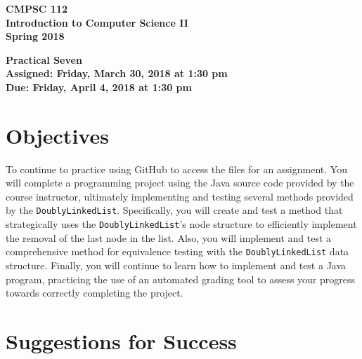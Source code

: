 \documentclass[11pt]{article}
\newcommand{\assignmentduedate}{April 4}
\newcommand{\assignmentassignedate}{March 30}
\newcommand{\assignmentnumber}{Seven}
\newcommand{\labyear}{2018}
\newcommand{\labday}{Friday}
\newcommand{\labtime}{1:30 pm}
\newcommand{\assigneddate}{Assigned: \labday, \assignmentassignedate, \labyear{} at \labtime{}}
\newcommand{\duedate}{Due: \labday, \assignmentduedate, \labyear{} at \labtime{}}
\newcommand{\mainprogram}{\lstinline{DoublyLinkedList}}
\newcommand{\labtitle}[1]
{
  \begin{center}
    \begin{center}
      \bf
      CMPSC 112\\Introduction to Computer Science II\\
      Spring 2018\\
      \medskip
    \end{center}
    \bf
    #1
  \end{center}
}
\begin{document}
\thispagestyle{empty}

\labtitle{Practical \assignmentnumber{} \\ \assigneddate{} \\ \duedate{}}

\section*{Objectives}

To continue to practice using GitHub to access the files for an assignment. You
will complete a programming project using the Java source code provided by the
course instructor, ultimately implementing and testing several methods provided
by the \mainprogram{}. Specifically, you will create and test a method that
strategically uses the \mainprogram's node structure to efficiently implement
the removal of the last node in the list. Also, you will implement and test a
comprehensive method for equivalence testing with the \mainprogram{} data
structure. Finally, you will continue to learn how to implement and test a Java
program, practicing the use of an automated grading tool to assess your progress
towards correctly completing the project.

\section*{Suggestions for Success}
\end{document}
